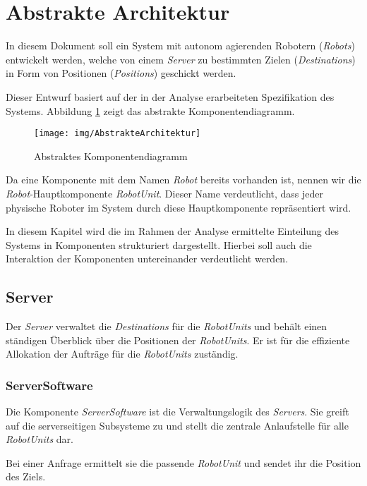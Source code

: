 \section{Abstrakte Architektur}
In diesem Dokument soll ein System mit autonom agierenden Robotern (\emph{Robots}) entwickelt werden, welche von einem \emph{Server} zu bestimmten Zielen (\emph{Destinations}) in Form von Positionen (\emph{Positions}) geschickt werden. 

Dieser Entwurf basiert auf der in der Analyse erarbeiteten Spezifikation des Systems. Abbildung \ref{KomponentendiagrammAbstrakt} zeigt das abstrakte Komponentendiagramm.

\begin{figure}[H]
\centering
\texttt{[image: img/AbstrakteArchitektur]}
\caption{Abstraktes Komponentendiagramm}
\label{KomponentendiagrammAbstrakt}
\end{figure}

Da eine Komponente mit dem Namen \emph{Robot} bereits vorhanden ist, nennen wir die \emph{Robot}-Hauptkomponente \emph{RobotUnit}. Dieser Name verdeutlicht, dass jeder physische Roboter im System durch diese Hauptkomponente repr\"{a}sentiert wird.


In diesem Kapitel wird die im Rahmen der Analyse ermittelte Einteilung des Systems in Komponenten strukturiert dargestellt. Hierbei soll auch die Interaktion der Komponenten untereinander verdeutlicht werden.

\subsection{Server}

Der \emph{Server} verwaltet die \emph{Destinations} f\"{u}r die \emph{RobotUnits} und beh\"{a}lt einen st\"{a}ndigen \"{U}berblick \"{u}ber die Positionen der \emph{RobotUnits}. Er ist f\"{u}r die effiziente Allokation der Auftr\"{a}ge f\"{u}r die \emph{RobotUnits} zust\"{a}ndig.

\subsubsection{ServerSoftware}

Die Komponente \emph{ServerSoftware} ist die Verwaltungslogik des \emph{Servers}. Sie greift auf die serverseitigen Subsysteme zu und stellt die zentrale Anlaufstelle f\"{u}r alle \emph{RobotUnits} dar. 

Bei einer Anfrage ermittelt sie die passende \emph{RobotUnit} und sendet ihr die Position des Ziels. 

